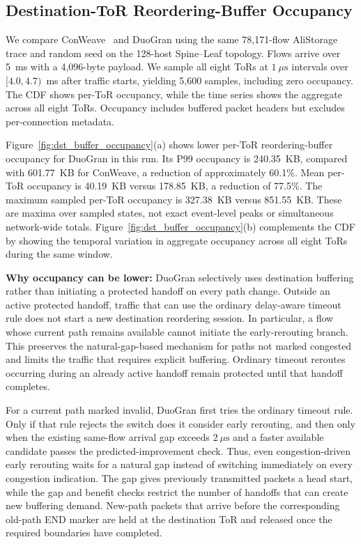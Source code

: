 \documentclass[10pt,journal,compsoc]{IEEEtran}
\begin{document}
\subsection{Destination-ToR Reordering-Buffer Occupancy}
\label{sec:dst_buffer_occupancy}

We compare ConWeave~\cite{Conweave} and DuoGran using the same 78,171-flow AliStorage trace and random seed on the 128-host Spine--Leaf topology. Flows arrive over 5~ms with a 4,096-byte payload. We sample all eight ToRs at $1~\mu\mathrm{s}$ intervals over $[4.0,4.7)$~ms after traffic starts, yielding 5,600 samples, including zero occupancy. The CDF shows per-ToR occupancy, while the time series shows the aggregate across all eight ToRs. Occupancy includes buffered packet headers but excludes per-connection metadata.

Figure~\ref{fig:dst_buffer_occupancy}(a) shows lower per-ToR reordering-buffer occupancy for DuoGran in this run. Its P99 occupancy is 240.35~KB, compared with 601.77~KB for ConWeave, a reduction of approximately 60.1\%. Mean per-ToR occupancy is 40.19~KB versus 178.85~KB, a reduction of 77.5\%. The maximum sampled per-ToR occupancy is 327.38~KB versus 851.55~KB. These are maxima over sampled states, not exact event-level peaks or simultaneous network-wide totals. Figure~\ref{fig:dst_buffer_occupancy}(b) complements the CDF by showing the temporal variation in aggregate occupancy across all eight ToRs during the same window.

\noindent\textbf{Why occupancy can be lower:} DuoGran selectively uses destination buffering rather than initiating a protected handoff on every path change. Outside an active protected handoff, traffic that can use the ordinary delay-aware timeout rule does not start a new destination reordering session. In particular, a flow whose current path remains available cannot initiate the early-rerouting branch. This preserves the natural-gap-based mechanism for paths not marked congested and limits the traffic that requires explicit buffering. Ordinary timeout reroutes occurring during an already active handoff remain protected until that handoff completes.

For a current path marked invalid, DuoGran first tries the ordinary timeout rule. Only if that rule rejects the switch does it consider early rerouting, and then only when the existing same-flow arrival gap exceeds $2~\mu\mathrm{s}$ and a faster available candidate passes the predicted-improvement check. Thus, even congestion-driven early rerouting waits for a natural gap instead of switching immediately on every congestion indication. The gap gives previously transmitted packets a head start, while the gap and benefit checks restrict the number of handoffs that can create new buffering demand. New-path packets that arrive before the corresponding old-path END marker are held at the destination ToR and released once the required boundaries have completed.
\end{document}
